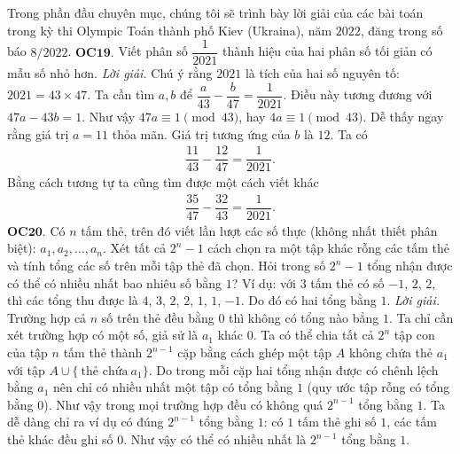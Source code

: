 \thispagestyle{cackithitoannone}
\pagestyle{cackithitoan}
\everymath{\color{cackithi}}
\graphicspath{{../cackithi/pic/}}
\begingroup
{} 
\centering
\endgroup
\vspace*{130pt}

\begin{multicols}{2}
	Trong phần đầu chuyên mục, chúng tôi sẽ trình bày lời giải của các bài toán trong kỳ thi Olympic Toán thành phố Kiev (Ukraina), năm $2022$,   đăng trong số báo $8/2022$. 
	\vskip 0.1cm
	{\bf\color{cackithi} OC$\pmb{19.}$}  Viết phân số $\dfrac{1}{2021}$ thành hiệu của hai phân số tối giản có mẫu số nhỏ hơn.
	\vskip 0.1cm
	\textit{Lời giải.} Chú ý rằng $2021$ là tích của hai số nguyên tố: $2021=43\times 47$.
	\vskip 0.1cm
	Ta cần tìm $a, b$ để $\dfrac{a}{43} - \dfrac{b}{47}= \dfrac{1}{2021}$. Điều này tương đương với $47a-43b=1$. Như vậy $47a\equiv 1 \pmod{43}$, hay $4a\equiv 1\pmod{43}$. Dễ thấy ngay rằng giá trị $a=11$ thỏa mãn. Giá trị tương ứng của $b$ là $12$. Ta có 
	\begin{align*}
		\dfrac{11}{43} - \dfrac{12}{47}= \dfrac{1}{2021}.
	\end{align*} 
	Bằng cách tương tự ta cũng tìm được một cách viết khác 
	\begin{align*}
		\dfrac{35}{47} - \dfrac{32}{43}= \dfrac{1}{2021}.
	\end{align*}
	{\bf\color{cackithi} OC$\pmb{20.}$} Có $n$ tấm thẻ, trên đó viết lần lượt các số thực (không nhất thiết phân biệt): $a_1, a_2, \ldots, a_n $.  Xét tất cả $ 2^n-1 $ cách chọn ra một tập khác rỗng các tấm thẻ và tính tổng các số trên mỗi tập thẻ đã chọn. Hỏi trong số $2^n-1$ tổng nhận được có thể có nhiều nhất bao nhiêu số bằng $1$?
	\vskip 0.1cm
	Ví dụ: với $3$ tấm thẻ có số $-1$, $2$, $2$, thì các tổng thu được là $4$, $3$, $2$, $2$, $1$, $1$, $-1$. Do đó có hai tổng bằng $1$.
	\vskip 0.1cm
	\textit{Lời giải.} Trường hợp cả $n$ số trên thẻ đều bằng $0$ thì không có tổng nào bẳng $1$. Ta chỉ cần xét trường hợp có một số, giả sử là $a_1$ khác $0$. Ta có thể chia tất cả $2^n$ tập con của tập $n$ tấm thẻ thành $2^{n-1}$ cặp bằng cách ghép một tập $A$ không chứa thẻ $a_1$ với tập $A\cup \{\ \text{thẻ chứa}\ a_1\}$. Do trong mỗi cặp hai tổng nhận được có chênh lệch bằng $a_1$ nên chỉ có nhiều nhất một tập có tổng bằng $1$ (quy ước tập rỗng có tổng bằng $0$).
	\vskip 0.1cm
	Như vậy trong mọi trường hợp đều có không quá $2^{n-1}$ tổng bằng $1$. Ta dễ dàng chỉ ra ví dụ có đúng $2^{n-1}$ tổng bằng $1$:  có  $1$ tấm thẻ ghi số $1$, các tấm thẻ khác đều ghi số $0$. Như vậy có thể có nhiều nhất là $2^{n-1}$ tổng bằng $1$.

\end{multicols}
